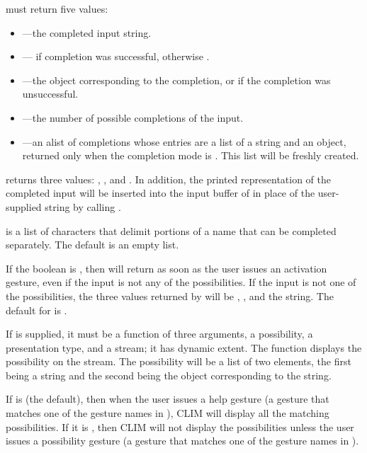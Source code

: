  must return five values:

\begin{itemize}
\item {}---the completed input string.

\item {}--- if completion was successful, otherwise
.

\item {}---the object corresponding to the completion, or  if
the completion was unsuccessful.

\item {}---the number of possible completions of the input.

\item {}---an alist of completions whose entries are a list
of a string and an object, returned only when the completion mode is
.  This list will be freshly created.
\end{itemize}

 returns three values: , , and
.  In addition, the printed representation of the completed input
will be inserted into the input buffer of  in place of the
user-supplied string by calling .

 is a list of characters that delimit portions of a name
that can be completed separately.  The default is an empty list.

If the boolean  is , then 
will return as soon as the user issues an activation gesture, even if the input
is not any of the possibilities.  If the input is not one of the possibilities,
the three values returned by  will be , , and
the string.  The default for  is .

If  is supplied, it must be a function of three
arguments, a possibility, a presentation type, and a stream; it has dynamic
extent.  The function displays the possibility on the stream.  The possibility
will be a list of two elements, the first being a string and the second being
the object corresponding to the string.

If  is  (the default), then when the
user issues a help gesture (a gesture that matches one of the gesture names in
), CLIM will display all the matching possibilities. If it
is , then CLIM will not display the possibilities unless the user
issues a possibility gesture (a gesture that matches one of the gesture names in
).



